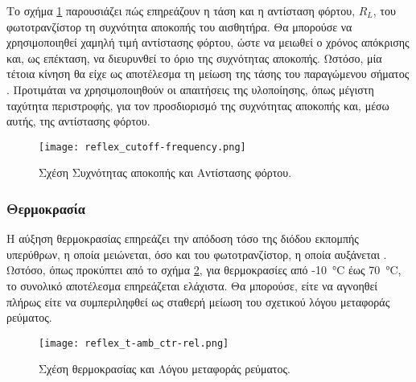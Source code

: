 Το σχήμα \ref{fig:reflex:cutoff-frequency} παρουσιάζει πώς επηρεάζουν η τάση και
η αντίσταση φόρτου, $R_L$, του φωτοτρανζίστορ τη συχνότητα αποκοπής του
αισθητήρα.
Θα μπορούσε να χρησιμοποιηθεί χαμηλή τιμή αντίστασης φόρτου, ώστε να
μειωθεί ο χρόνος απόκρισης και, ως επέκταση, να διευρυνθεί το όριο της
συχνότητας αποκοπής. Ωστόσο, μία τέτοια κίνηση θα είχε ως αποτέλεσμα τη
μείωση της τάσης του παραγώμενου σήματος \parencite{vishay06}.
Προτιμάται να χρησιμοποιηθούν οι απαιτήσεις της υλοποίησης, όπως μέγιστη
ταχύτητα περιστροφής, για τον προσδιορισμό της συχνότητας αποκοπής και, μέσω
αυτής, της αντίστασης φόρτου.

\begin{figure}
    \caption{Σχέση Συχνότητας αποκοπής και Αντίστασης φόρτου.
    \label{fig:reflex:cutoff-frequency}}
    \begin{center}%
    \texttt{[image: reflex\_cutoff-frequency.png]}
    \end{center}

\end{figure}

\subsubsection{Θερμοκρασία}
Η αύξηση θερμοκρασίας επηρεάζει την απόδοση τόσο της διόδου εκπομπής υπερύθρων,
η οποία μειώνεται, όσο και του φωτοτρανζίστορ, η οποία αυξάνεται
\parencite{vishay06}. Ωστόσο, όπως προκύπτει από το σχήμα
\ref{fig:reflex:t-amb_ctr-rel}, για θερμοκρασίες από -10~°C έως 70~°C, το
συνολικό αποτέλεσμα επηρεάζεται ελάχιστα. Θα μπορούσε, είτε να αγνοηθεί
πλήρως είτε να συμπεριληφθεί ως σταθερή μείωση του σχετικού λόγου μεταφοράς
ρεύματος.

\begin{figure}
    \caption{Σχέση θερμοκρασίας και Λόγου μεταφοράς ρεύματος.
    \label{fig:reflex:t-amb_ctr-rel}}
    \begin{center}%
    \texttt{[image: reflex\_t-amb\_ctr-rel.png]}
    \end{center}

\end{figure}
